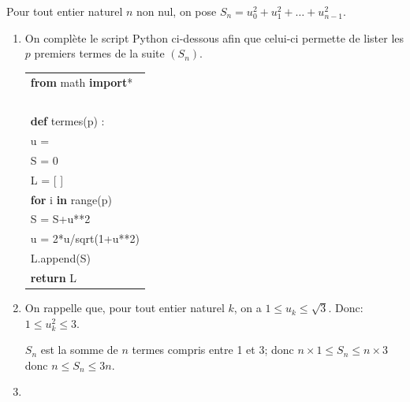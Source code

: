 Pour tout entier naturel $n$ non nul, on pose $S_n = u_0^2 + u_1^2 + \ldots + u_{n-1}^2$.

\medskip

\begin{enumerate}
\item On complète le script Python ci-dessous afin que celui-ci permette de lister les $p$ premiers termes de la suite $(S_n)$.

\begin{center}
\begin{ttfamily}
\begin{tabular}{|l|}\hline
\textbf{from} math \textbf{import}*\\
~\\
\textbf{def} termes(p) :\\
\qquad  u = \blue 1\\
\qquad  S = 0\\
\qquad  L = [ ]\\
\qquad  \textbf{for} i \textbf{in} range(p)\\
\qquad \qquad S = \blue{}S+u**2\\
\qquad \qquad u = \blue{}2*u/sqrt(1+u**2)\\
\qquad \qquad L.append(S) \\
\qquad \textbf{return} L\\ \hline
\end{tabular}
\end{ttfamily}
\end{center}








\item On rappelle que, pour tout entier naturel $k$, on a $1 \leqslant u_k \leqslant \sqrt 3$. Donc: $1 \leqslant u_k^2 \leqslant 3$.

$S_n$ est la somme de $n$ termes compris entre 1 et 3; donc $n\times 1 \leqslant S_n \leqslant n\times 3$ donc $n \leqslant S_n \leqslant 3n$.



\item
{}

\end{enumerate}

\medskip
